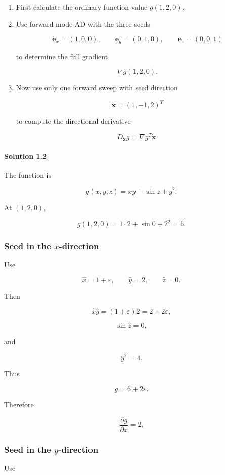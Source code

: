 \documentclass[10pt]{article}
\begin{document}
\begin{enumerate}
\item
First calculate the ordinary function value $g(1,2,0)$.

\item
Use forward-mode AD with the three seeds

\[
\mathbf{e}_x=(1,0,0),
   \qquad
   \mathbf{e}_y=(0,1,0),
   \qquad
   \mathbf{e}_z=(0,0,1)
\]

to determine the full gradient

\[
\nabla g(1,2,0).
\]

\item
Now use only one forward sweep with seed direction

\[
\dot{\mathbf{x}}=(1,-1,2)^T
\]

to compute the directional derivative

\[
D_{\dot{\mathbf{x}}}g
   =
   \nabla g^T\dot{\mathbf{x}}.
\]

\end{enumerate}

\begingroup\color{red}
\paragraph*{Solution 1.2}
The function is

\[
g(x,y,z)=xy+\sin z+y^2.
\]

At $(1,2,0)$,

\[
g(1,2,0)=1\cdot2+\sin 0+2^2=6.
\]

\subsubsection*{Seed in the $x$-direction}
Use

\[
\hat{x}=1+\varepsilon,
\qquad
\hat{y}=2,
\qquad
\hat{z}=0.
\]

Then

\[
\hat{x}\hat{y}
=(1+\varepsilon)2
=2+2\varepsilon,
\]

\[
\sin\hat{z}=0,
\]

and

\[
\hat{y}^2=4.
\]

Thus

\[
g=6+2\varepsilon.
\]

Therefore

\[
\frac{\partial g}{\partial x}=2.
\]

\subsubsection*{Seed in the $y$-direction}
Use
\end{document}
